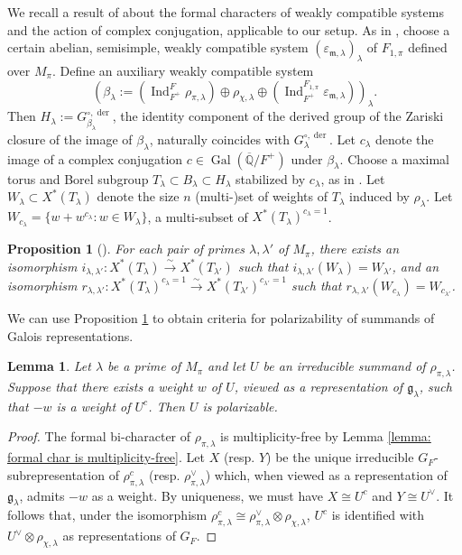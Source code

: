 \documentclass{amsart}
\newtheorem{lemma}[theorem]{Lemma}
\newtheorem{proposition}[theorem]{Proposition}
\theoremstyle{definition}
\numberwithin{equation}{section} %
\newcommand{\der}{\operatorname{der}}
\newcommand{\Gal}{\operatorname{Gal}}
\newcommand{\Ind}{\operatorname{Ind}}
\newcommand{\eps}{\varepsilon}
\newcommand{\bb}[1]{\mathbb{#1}}
\newcommand{\mf}[1]{\mathfrak{#1}}
\newcommand{\ol}[1]{\overline{#1}}
\begin{document}
We recall a result of \cite{Xia19} about the formal characters of weakly compatible systems and the action of complex conjugation, applicable to our setup.
As in \cite[\S 8]{Xia19}, choose a certain abelian, semisimple, weakly compatible system $(\eps_{\mathfrak{m},\lambda})_\lambda$ of $F_{1,\pi}$ defined over $M_\pi$.
Define an auxiliary weakly compatible system
\[
(\beta_\lambda := (\Ind_{F^+}^F \rho_{\pi,\lambda}) \oplus  \rho_{\chi,\lambda} \oplus (\Ind_{F^+}^{F_{1,\pi}} \eps_{\mathfrak{m},\lambda}))_\lambda.
\]
Then $H_\lambda := G_{\beta_\lambda}^{\circ,\der}$, the identity component  of the derived group of the Zariski closure of the image of $\beta_\lambda$, naturally coincides with $G^{\circ,\der}_\lambda$.
Let $c_\lambda$ denote the image of a complex conjugation $c \in \Gal(\ol{\bb{Q}}/F^+)$ under $\beta_\lambda$. Choose a maximal torus and Borel subgroup $T_\lambda \subset B_\lambda \subset H_\lambda$ stabilized by $c_\lambda$, as in \cite[Proposition 8]{Xia19}. 
Let $W_\lambda \subset X^*(T_\lambda)$ denote the size $n$ (multi-)set of weights of $T_\lambda$ induced by $\rho_\lambda$.
Let $W_{c_\lambda} = \{w + w^{c_\lambda} : w \in W_\lambda\}$, a multi-subset of $X^*(T_\lambda)^{c_\lambda = 1}$.

\begin{proposition}[{\cite[Proposition 17]{Xia19}}] \label{prop: complex conjugation formal character action}
For each pair of primes $\lambda, \lambda'$ of $M_\pi$, there exists an isomorphism $i_{\lambda,\lambda'}: X^*(T_\lambda) \xrightarrow{\sim} X^*(T_{\lambda'})$ such that $i_{\lambda,\lambda'}(W_\lambda) = W_{\lambda'}$, and an isomorphism $r_{\lambda,\lambda'}: X^*(T_\lambda)^{c_\lambda = 1} \xrightarrow{\sim} X^*(T_{\lambda'})^{c_{\lambda'} = 1}$ such that $r_{\lambda,\lambda'}(W_{c_\lambda}) = W_{c_{\lambda'}}$.
\end{proposition}

We can use Proposition \ref{prop: complex conjugation formal character action} to obtain criteria for polarizability of summands of Galois representations.

\begin{lemma} \label{lemma: conjugate self dual summand criterion}
Let $\lambda$ be a prime of $M_\pi$ and let $U$ be an irreducible summand of $\rho_{\pi,\lambda}$.
Suppose that there exists a weight $w$ of $U$, viewed as a representation of $\mf{g}_\lambda$, such that $-w$ is a weight of $U^c$.
Then $U$ is polarizable.
\end{lemma}
\begin{proof}
The formal bi-character of $\rho_{\pi,\lambda}$ is multiplicity-free by Lemma \ref{lemma: formal char is multiplicity-free}.
Let $X$ (resp. $Y$) be the unique irreducible $G_F$-subrepresentation of $\rho_{\pi,\lambda}^c$ (resp. $\rho_{\pi,\lambda}^\vee$) which, when viewed as a representation of $\mf{g}_\lambda$, admits $-w$ as a weight.
By uniqueness, we must have $X \cong U^c$ and $Y \cong U^\vee$.
It follows that, under the isomorphism $\rho_{\pi,\lambda}^c \cong \rho_{\pi,\lambda}^\vee \otimes \rho_{\chi,\lambda}$, $U^c$ is identified with $U^\vee \otimes \rho_{\chi,\lambda}$ as representations of $G_F$. 
\end{proof}
\end{document}
